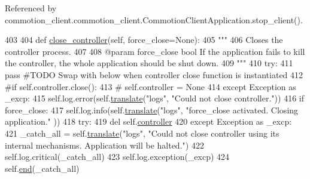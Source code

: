 Referenced by commotion\+\_\+client.\+commotion\+\_\+client.\+Commotion\+Client\+Application.\+stop\+\_\+client().


\begin{DoxyCode}
403 
404     \textcolor{keyword}{def }\hyperlink{classcommotion__client_1_1commotion__client_1_1CommotionClientApplication_aa35cc13c36cfa90d6ac3de6db56e5fc4}{close\_controller}(self, force\_close=None):
405         \textcolor{stringliteral}{"""}
406 \textcolor{stringliteral}{        Closes the controller process.}
407 \textcolor{stringliteral}{}
408 \textcolor{stringliteral}{        @param force\_close bool If the application fails to kill the controller, the whole application
       should be shut down.}
409 \textcolor{stringliteral}{        """}
410         \textcolor{keywordflow}{try}:
411             \textcolor{keywordflow}{pass} \textcolor{comment}{#TODO Swap with below when controller close function is instantiated}
412             \textcolor{comment}{#if self.controller.close():}
413             \textcolor{comment}{#    self.controller = None}
414         \textcolor{keywordflow}{except} Exception \textcolor{keyword}{as} \_excp:
415             self.log.error(self.\hyperlink{classcommotion__client_1_1commotion__client_1_1CommotionClientApplication_a57e951c9b241fb0e0c70055b4ca1b6f7}{translate}(\textcolor{stringliteral}{"logs"}, \textcolor{stringliteral}{"Could not close controller."}))
416             \textcolor{keywordflow}{if} force\_close:
417                 self.log.info(self.\hyperlink{classcommotion__client_1_1commotion__client_1_1CommotionClientApplication_a57e951c9b241fb0e0c70055b4ca1b6f7}{translate}(\textcolor{stringliteral}{"logs"}, \textcolor{stringliteral}{"force\_close activated. Closing application."}
      ))
418                 \textcolor{keywordflow}{try}:
419                     del self.\hyperlink{classcommotion__client_1_1commotion__client_1_1CommotionClientApplication_a2def597b4431ad9a5dbb7ce4339ba0e0}{controller}
420                 \textcolor{keywordflow}{except} Exception \textcolor{keyword}{as} \_excp:
421                     \_catch\_all = self.\hyperlink{classcommotion__client_1_1commotion__client_1_1CommotionClientApplication_a57e951c9b241fb0e0c70055b4ca1b6f7}{translate}(\textcolor{stringliteral}{"logs"}, \textcolor{stringliteral}{"Could not close controller using its
       internal mechanisms. Application will be halted."})
422                     self.log.critical(\_catch\_all)
423                     self.log.exception(\_excp)
424                     self.\hyperlink{classcommotion__client_1_1commotion__client_1_1CommotionClientApplication_af2043aac2ebc25f55b73ec317d6ea463}{end}(\_catch\_all)

\end{DoxyCode}
